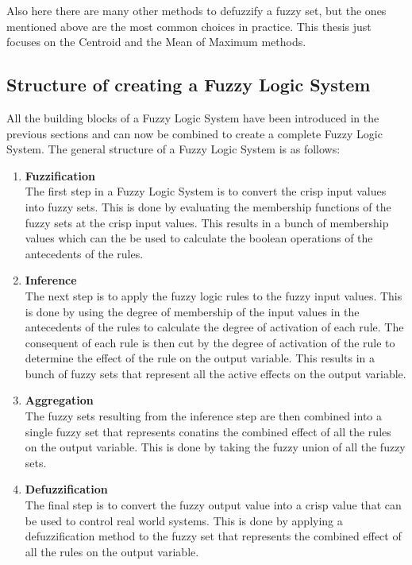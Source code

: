 Also here there are many other methods to defuzzify a fuzzy set, but the ones mentioned above are the most common choices in practice. This thesis just focuses on the Centroid and the Mean of Maximum methods.


\subsection{Structure of creating a Fuzzy Logic System}

All the building blocks of a Fuzzy Logic System have been introduced in the previous sections and can now be combined to create a complete Fuzzy Logic System. The general structure of a Fuzzy Logic System is as follows:

\begin{enumerate}
      \item \textbf{Fuzzification} \\
            The first step in a Fuzzy Logic System is to convert the crisp input values into fuzzy sets. This is done by evaluating the membership functions of the fuzzy sets at the crisp input values. This results in a bunch of membership values which can the be used to calculate the boolean operations of the antecedents of the rules.

      \item \textbf{Inference} \\
            The next step is to apply the fuzzy logic rules to the fuzzy input values. This is done by using the degree of membership of the input values in the antecedents of the rules to calculate the degree of activation of each rule. The consequent of each rule is then cut by the degree of activation of the rule to determine the effect of the rule on the output variable. This results in a bunch of fuzzy sets that represent all the active effects on the output variable.

      \item \textbf{Aggregation} \\
            The fuzzy sets resulting from the inference step are then combined into a single fuzzy set that represents conatins the combined effect of all the rules on the output variable. This is done by taking the fuzzy union of all the fuzzy sets.

      \item \textbf{Defuzzification} \\
            The final step is to convert the fuzzy output value into a crisp value that can be used to control real world systems. This is done by applying a defuzzification method to the fuzzy set that represents the combined effect of all the rules on the output variable.
\end{enumerate}


